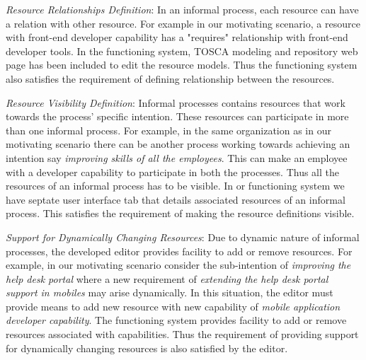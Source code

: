 \textit{Resource Relationships Definition}: In an informal process, each resource can have a relation with other resource. For example in our motivating scenario, a resource with front-end developer capability has a "requires" relationship with front-end developer tools. In the functioning system, TOSCA modeling and repository web page has been included to edit the resource models. Thus the functioning system also satisfies the requirement of defining relationship between the resources. 

\textit{Resource Visibility Definition}: Informal processes contains resources that work towards the process' specific intention. These resources can participate in more than one informal process. For example, in the same organization as in our motivating scenario there can be another process working towards achieving an intention say \textit{improving skills of all the employees}. This can make an employee with a developer capability to participate in both the processes. Thus all the resources of an informal process has to be visible. In or functioning system we have septate user interface tab that details associated resources of an informal process. This satisfies the requirement of making the resource definitions visible.    

\textit{Support for Dynamically Changing Resources}: Due to dynamic nature of informal processes, the developed editor provides facility to add or remove resources. For example, in our motivating scenario consider the sub-intention of \textit{improving the help desk portal} where a new requirement of \textit{extending the help desk portal support in mobiles} may arise dynamically. In this situation, the editor must provide means to add new resource with new capability of \textit{mobile application developer capability}. The functioning system provides facility to add or remove resources associated with capabilities. Thus the requirement of providing support for dynamically changing resources is also satisfied by the editor. 
	



